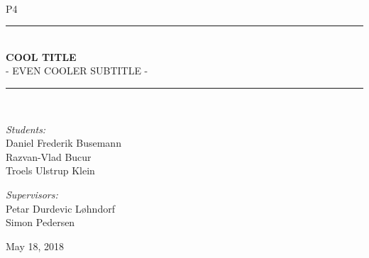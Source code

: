 \newcommand{\HRule}{\rule{\linewidth}{0.5 mm}}
\begin{titlepage}

\begin{center}
\\[0.5cm]

\textsc{\Large P4}\\[0.6cm]

\HRule \\[0.8cm]
{ \Huge \bfseries  COOL TITLE}\\[0.4cm]

  \Large{ - EVEN COOLER SUBTITLE -
  }

\HRule \\[1.2cm]

\begin{minipage}{0.49\textwidth}
\begin{flushleft} \large
\emph{Students:}\\
Daniel Frederik Busemann\\
Razvan-Vlad Bucur\\
Troels Ulstrup Klein\\
\end{flushleft}
\end{minipage}
\begin{minipage}{0.49\textwidth}
\begin{flushright} \large
\emph{Supervisors:} \\
Petar Durdevic Løhndorf\\
Simon Pedersen
\end{flushright}
\end{minipage}

\vfill

{\large May 18, 2018}



\end{center}

\end{titlepage}
